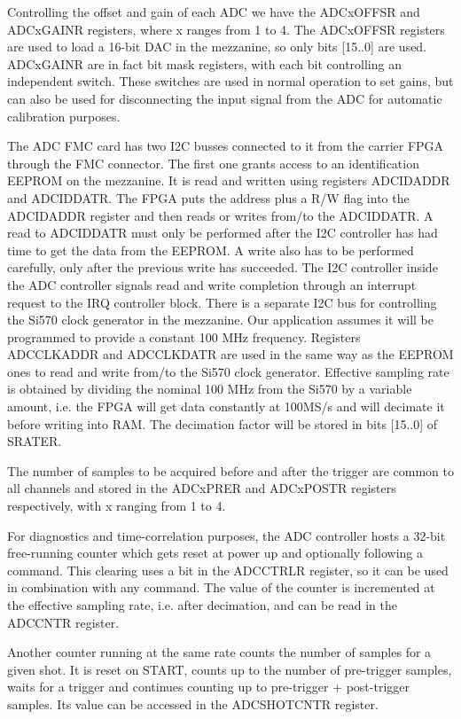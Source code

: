 \documentclass{article}
\begin{document}
Controlling the offset and gain of each ADC we have the ADCxOFFSR and ADCxGAINR registers, where x ranges from 1 to 4. The ADCxOFFSR registers are used to load a 16-bit DAC in the mezzanine, so only bits [15..0] are used. ADCxGAINR are in fact bit mask registers, with each bit controlling an independent switch. These switches are used in normal operation to set gains, but can also be used for disconnecting the input signal from the ADC for automatic calibration purposes.

The ADC FMC card has two I2C busses connected to it from the carrier FPGA through the FMC connector. The first one grants access to an identification EEPROM on the mezzanine. It is read and written using registers ADCIDADDR and ADCIDDATR. The FPGA puts the address plus a R/W flag into the ADCIDADDR register and then reads or writes from/to the ADCIDDATR. A read to ADCIDDATR must only be performed after the I2C controller has had time to get the data from the EEPROM. A write also has to be performed carefully, only after the previous write has succeeded. The I2C controller inside the ADC controller signals read and write completion through an interrupt request to the IRQ controller block. There is a separate I2C bus for controlling the Si570 clock generator in the mezzanine. Our application assumes it will be programmed to provide a constant 100 MHz frequency. Registers ADCCLKADDR and ADCCLKDATR are used in the same way as the EEPROM ones to read and write from/to the Si570 clock generator. Effective sampling rate is obtained by dividing the nominal 100 MHz from the Si570 by a variable amount, i.e. the FPGA will get data constantly at 100MS/s and will decimate it before writing into RAM. The decimation factor will be stored in bits [15..0] of SRATER.

The number of samples to be acquired before and after the trigger are common to all channels and stored in the ADCxPRER and ADCxPOSTR registers respectively, with x ranging from 1 to 4.  

For diagnostics and time-correlation purposes, the ADC controller hosts a 32-bit free-running counter which gets reset at power up and optionally following a command. This clearing uses a bit in the ADCCTRLR register, so it can be used in combination with any command. The value of the counter is incremented at the effective sampling rate, i.e. after decimation, and can be read in the ADCCNTR register.   

Another counter running at the same rate counts the number of samples for a given shot. It is reset on START, counts up to the number of pre-trigger samples, waits for a trigger and continues counting up to pre-trigger + post-trigger samples. Its value can be accessed in the ADCSHOTCNTR register.
\end{document}
